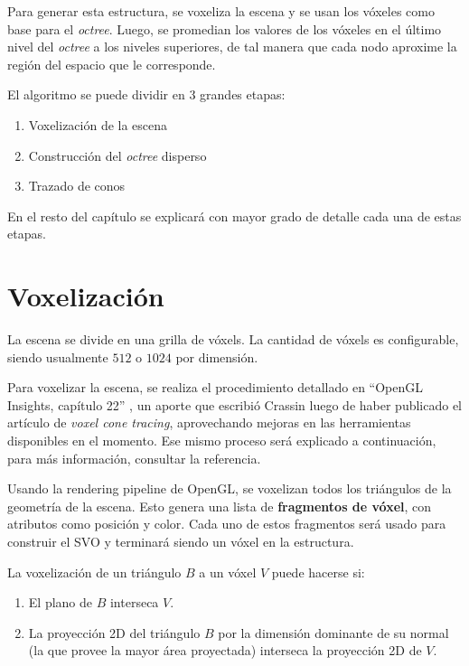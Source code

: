 Para generar esta estructura, se voxeliza la escena y se usan los vóxeles como base para el \textit{octree}.
Luego, se promedian los valores de los vóxeles en el último nivel del \textit{octree} a los niveles superiores, de tal manera que cada nodo aproxime la región del espacio que le corresponde.

El algoritmo se puede dividir en 3 grandes etapas:

\begin{enumerate}
    \item Voxelización de la escena
    \item Construcción del \textit{octree} disperso
    \item Trazado de conos
\end{enumerate}

En el resto del capítulo se explicará con mayor grado de detalle cada una de estas etapas.

\section{Voxelización}

La escena se divide en una grilla de vóxels.
La cantidad de vóxels es configurable, siendo usualmente $512$ o $1024$ por dimensión.

Para voxelizar la escena, se realiza el procedimiento detallado en ``OpenGL Insights, capítulo 22'' \cite{opengl-insights}, un aporte que escribió Crassin luego de haber publicado el artículo de \textit{voxel cone tracing}, aprovechando mejoras en las herramientas disponibles en el momento.
Ese mismo proceso será explicado a continuación, para más información, consultar la referencia.

Usando la rendering pipeline de OpenGL, se voxelizan todos los triángulos de la geometría de la escena.
Esto genera una lista de \textbf{fragmentos de vóxel}, con atributos como posición y color.
Cada uno de estos fragmentos será usado para construir el SVO y terminará siendo un vóxel en la estructura.

La voxelización de un triángulo $B$ a un vóxel $V$ puede hacerse si:

\begin{enumerate}
    \item El plano de $B$ interseca $V$.
    \item La proyección 2D del triángulo $B$ por la dimensión dominante de su normal (la que provee la mayor área proyectada) interseca la proyección 2D de $V$.
\end{enumerate}

